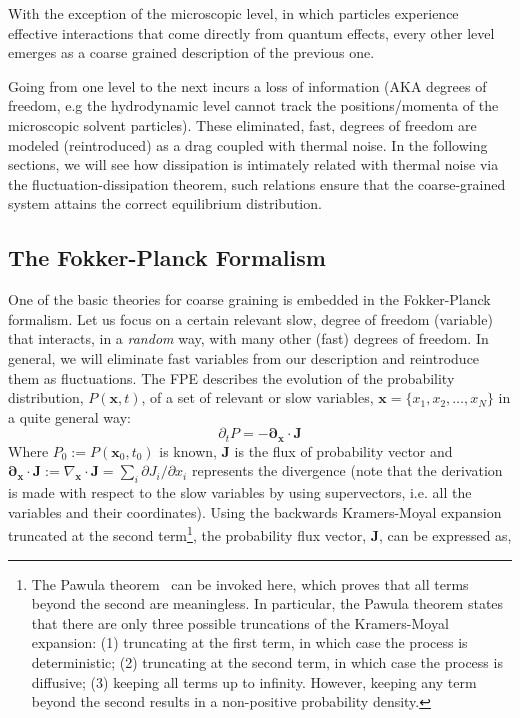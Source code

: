 \documentclass[twoside,openright,titlepage,numbers=noenddot,%
headinclude,footinclude,cleardoublepage=empty,abstract=on,
BCOR=5mm,fontsize=11pt, dvipsnames, paper=b5
]{scrreprt}
\renewcommand{\vec}[1]{\bm{#1}}
\begin{document}
With the exception of the microscopic level, in which particles experience effective interactions that come directly from quantum effects, every other level emerges as a coarse grained description of the previous one. 

Going from one level to the next incurs a loss of information (AKA degrees of freedom, e.g the hydrodynamic level cannot track the positions/momenta of the microscopic solvent particles). These eliminated, fast, degrees of freedom are modeled (reintroduced) as a drag coupled with thermal noise. In the following sections, we will see how dissipation is intimately related with thermal noise via the fluctuation-dissipation theorem, such relations ensure that the coarse-grained system attains the correct equilibrium distribution.


\subsection{The Fokker-Planck Formalism}\label{sec:fpe}
One of the basic theories for coarse graining is embedded in the Fokker-Planck formalism. Let us focus on a certain relevant slow, degree of freedom (variable) that interacts, in a \emph{random} way, with many other (fast) degrees of freedom. In general, we will eliminate fast variables from our description and reintroduce them as fluctuations. The \gls{FPE} describes the evolution of the probability distribution, $P(\vec{x},t)$, of a set of relevant or slow variables, $\vec{x} = \{x_1, x_2,\dots, x_N\}$ in a quite general way:
  \begin{equation}
    \label{eq:fpe}
    \partial_t P = -\vec{\partial}_{\vec{x}}\cdot \vec{J}
  \end{equation}
Where $P_0 := P(\vec{x}_0, t_0)$ is known, $\vec{J}$ is the flux of probability vector  and $\vec{\partial}_{\vec{x}}\cdot \vec{J} := \nabla_{\vec{x}}\cdot\vec{J} = \sum_i\partial J_i/\partial x_i  $ represents the divergence (note that the derivation is made with respect to the slow variables by using supervectors, i.e. all the variables and their coordinates\cite{Dhont1996}).
Using the backwards Kramers-Moyal expansion~\cite{Risken2012} truncated at the second term\footnote{The Pawula theorem~\cite{Tabar2019} can be invoked here, which proves that all terms beyond the second are meaningless. In particular, the Pawula theorem states that there are only three possible truncations of the Kramers-Moyal expansion: (1) truncating at the first term, in which case the process is deterministic; (2) truncating at the second term, in which case the process is diffusive; (3) keeping all terms up to infinity. However, keeping any term beyond the second results in a non-positive probability density.}, the probability flux vector, $\vec{J}$, can be expressed as,
\end{document}
